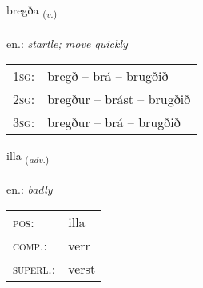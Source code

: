 \documentclass[frontgrid, backgrid]{flacards}\usepackage[]{graphicx}\usepackage[]{xcolor}
\begin{document}
{bregða \small{\textsubscript{(\textit{v.})}} \\[1ex] %
\textphonetic{[prɛɣða]} \\
en.: \emph{startle; move quickly} \\  [2ex]
\renewcommand*{\arraystretch}{0.8}
\begin{tabular}{p{1cm}l}
\textsc{1sg}: & bregð -- brá -- brugðið \\ 
\textsc{2sg}: & bregður -- brást -- brugðið \\ 
\textsc{3sg}: & bregður -- brá -- brugðið \\ 
\end{tabular}
}

\renewcommand{\flhead}{\vskip5pt \fboxsep=0pt {\small\bfseries\footnotesize Atviksorð | Adverb}}
\renewcommand{\fcfoot}{\vskip5pt \fboxsep=0pt \hspace{2pt}{\small\bfseries\footnotesize 1K}}

\renewcommand{\blhead}{\vskip5pt {\small\bfseries\footnotesize Atviksorð | Adverb }}
\renewcommand{\bcfoot}{\vskip5pt \hspace{2pt}{\small\bfseries\footnotesize 1K}}


{illa \small{\textsubscript{(\textit{adv.})}} \\[1ex] %
\textphonetic{[ɪtla]} \\
en.: \emph{badly} \\  [2ex]
\renewcommand*{\arraystretch}{0.8}
\begin{tabular}{ll}
\textsc{pos}: & illa \\ 
\textsc{comp.}: & verr \\ 
\textsc{superl.}: & verst \\
\end{tabular}
}

\renewcommand{\flhead}{\vskip5pt \fboxsep=0pt {\small\bfseries\footnotesize Nafnorð | Noun}}
\renewcommand{\fcfoot}{\vskip5pt \fboxsep=0pt \hspace{2pt}{\small\bfseries\footnotesize 1K}}
\end{document}
